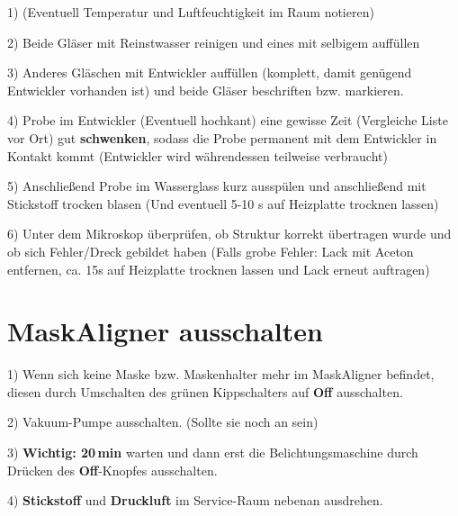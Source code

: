 \documentclass[
  ngerman,
  twoside,
  captions=tableheading,
  BCOR=.5cm,
  fontsize=11,
  ]{scrreprt}
\begin{document}
\begin{description}


\item 1) (Eventuell Temperatur und Luftfeuchtigkeit im Raum notieren)

\item 2) Beide Gläser mit Reinstwasser reinigen und eines mit selbigem auffüllen

\item 3) Anderes Gläschen mit Entwickler auffüllen (komplett, damit genügend Entwickler vorhanden ist) und beide Gläser beschriften bzw. markieren.

\item 4) Probe im Entwickler (Eventuell hochkant) eine gewisse Zeit (Vergleiche Liste vor Ort) gut \textbf{schwenken}, sodass die Probe permanent mit dem Entwickler in Kontakt kommt (Entwickler wird währendessen teilweise verbraucht)

\item 5) Anschließend Probe im Wasserglass kurz ausspülen und anschließend mit Stickstoff trocken blasen (Und eventuell 5-10 s auf Heizplatte trocknen lassen)

\item 6) Unter dem Mikroskop überprüfen, ob Struktur korrekt übertragen wurde und ob sich Fehler/Dreck gebildet haben (Falls grobe Fehler: Lack mit Aceton entfernen, ca. 15s auf Heizplatte trocknen lassen und Lack erneut auftragen)

\end{description}

\chapter{MaskAligner ausschalten}
\begin{description}
\item 1) Wenn sich keine Maske bzw. Maskenhalter mehr im MaskAligner befindet, diesen durch Umschalten des grünen Kippschalters auf \textbf{Off} ausschalten.

\item 2) Vakuum-Pumpe ausschalten. (Sollte sie noch an sein)

\item 3) \textbf{Wichtig: 20\,min} warten und dann erst die Belichtungsmaschine durch Drücken des \textbf{Off}-Knopfes ausschalten.

\item 4) \textbf{Stickstoff} und \textbf{Druckluft} im Service-Raum nebenan ausdrehen.
\end{description}
\end{document}
